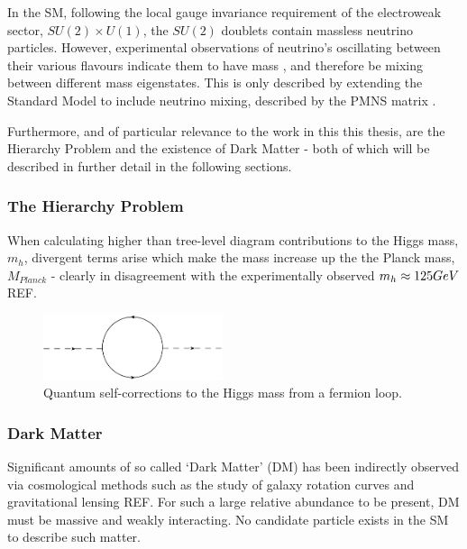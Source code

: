 In the SM, following the local gauge invariance requirement of the electroweak
sector, $SU(2)\times U(1)$, the $SU(2)$ doublets contain
massless neutrino particles. However, experimental observations of neutrino's
oscillating between their various flavours indicate them to have mass
\cite{PhysRevLett.81.1562,PhysRevLett.89.011302}, and
therefore be mixing between different mass eigenstates. This is only described
by extending the Standard Model to include neutrino mixing, described by the
PMNS matrix \cite{Altarelli:2002hx}.

Furthermore, and of particular relevance to the work in this this thesis, are
the Hierarchy Problem and the existence of Dark Matter - both of which will be
described in further detail in the following sections.

\subsubsection{The Hierarchy Problem}

When calculating higher than tree-level diagram contributions to the Higgs mass,
$m_h$, divergent terms arise which make the mass increase up the the Planck
mass, $M_{Planck}$ - clearly in disagreement with the experimentally observed
$m_h \approx 125 GeV$ REF.

\begin{figure}[ht!]
\centering
\includegraphics[width=0.47\textwidth]{Figs/feynman/higgs_loop_jaxo.png}
\caption{Quantum self-corrections to the Higgs mass from a fermion loop.}
\label{fig:quantum_higgs_fermion_loop}
\end{figure}

\subsubsection{Dark Matter}
Significant amounts of so called `Dark Matter' (DM) has been indirectly observed
via cosmological methods such as the study of galaxy rotation curves and
gravitational lensing REF. For such a large relative abundance to be present, DM
must be massive and weakly interacting. No candidate particle exists in the SM
to describe such matter.

